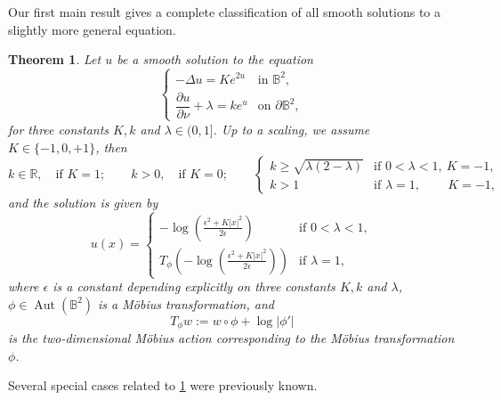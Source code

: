 \documentclass[11pt,a4paper,twoside]{amsart}
\newtheorem{theorem}{Theorem} [section]
\newtheorem{sketch proof}{Sketch of the proof}[section]
\begin{document}
Our first main result gives a complete classification of all smooth solutions to a slightly more general equation. 
\begin{theorem}
\label{ClassificationTh}
     Let $u$ be a smooth solution to the equation 
     \begin{equation} 
    \label{eq. conformal curvature equation}
    \begin{cases} -\Delta u = Ke^{2u} & \text{in } \mathbb{B}^2,\\[2mm] \dfrac{\partial u}{\partial \nu} + \lambda = ke^u & \text{on } \partial\mathbb{B}^2, \end{cases} 
    \end{equation}
     for three constants $K,k$ and $\lambda\in(0,1]$. Up to a scaling, we assume $K\in\{-1,0,+1\}$, then
     \[
     k\in\mathbb{R},\quad \text{if } K=1;\qquad
     k>0,\quad \text{if } K=0;\qquad
     \begin{cases}
         k\geq \sqrt{\lambda(2-\lambda)} &\text{if } 0<\lambda<1,\ K=-1,\\[2mm]
         k>1 &\text{if }
         \lambda=1,\qquad\, K=-1,
     \end{cases}
     \]
     and the solution is given by
     \[
     u(x)=
     \begin{cases}
         -\log
         \left(\frac{\epsilon^2+K |x|^2}{2\epsilon}\right)
         &\text{if }0<\lambda<1,\\[3mm]
         T_\phi\left(
         -\log
         \left(\frac{\epsilon^2+K |x|^2}{2\epsilon}\right)
         \right)
         &\text{if }\lambda=1,
     \end{cases}
     \]
     where $\epsilon$ is a constant depending explicitly on three constants $K,k$ and $\lambda$, $\phi\in \operatorname{Aut}(\mathbb{B}^2)$ is a M\"obius transformation, and 
     \begin{equation}
     \label{eq. Mobius action}
         T_\phi w:=w\circ\phi+\log |\phi'|
     \end{equation}
     is the two-dimensional M\"obius action  corresponding to the M\"obius transformation $\phi$.
\end{theorem}
\noindent Several special cases related to \cref{ClassificationTh} were previously known.
\end{document}
